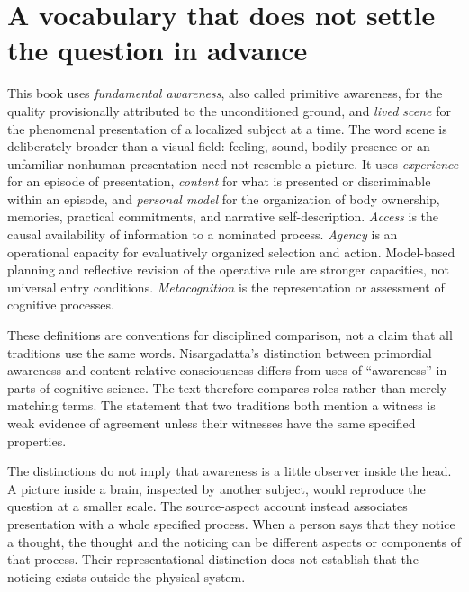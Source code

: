 \section{A vocabulary that does not settle the question in advance}\label{section:distinctions:a-vocabulary-that-does-not-settle-the-question-in-advance}
This book uses \emph{fundamental awareness}, also called primitive awareness, for the quality provisionally attributed to the unconditioned ground, and \emph{lived scene} for the phenomenal presentation of a localized subject at a time. The word scene is deliberately broader than a visual field: feeling, sound, bodily presence or an unfamiliar nonhuman presentation need not resemble a picture. It uses \emph{experience} for an episode of presentation, \emph{content} for what is presented or discriminable within an episode, and \emph{personal model} for the organization of body ownership, memories, practical commitments, and narrative self-description. \emph{Access} is the causal availability of information to a nominated process. \emph{Agency} is an operational capacity for evaluatively organized selection and action. Model-based planning and reflective revision of the operative rule are stronger capacities, not universal entry conditions. \emph{Metacognition} is the representation or assessment of cognitive processes.

These definitions are conventions for disciplined comparison, not a claim that all traditions use the same words. Nisargadatta's distinction between primordial awareness and content-relative consciousness differs from uses of ``awareness'' in parts of cognitive science. The text therefore compares roles rather than merely matching terms. The statement that two traditions both mention a witness is weak evidence of agreement unless their witnesses have the same specified properties.

The distinctions do not imply that awareness is a little observer inside the head. A picture inside a brain, inspected by another subject, would reproduce the question at a smaller scale. The source-aspect account instead associates presentation with a whole specified process. When a person says that they notice a thought, the thought and the noticing can be different aspects or components of that process. Their representational distinction does not establish that the noticing exists outside the physical system.

